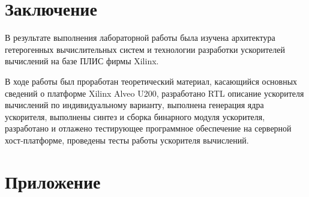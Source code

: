 \chapter*{Заключение}


В результате выполнения лабораторной работы была изучена архитектура гетерогенных вычислительных систем и технологии разработки ускорителей вычислений на базе ПЛИС фирмы Xilinx. 

В ходе работы был проработан теоретический материал, касающийся основных сведений о платформе Xilinx Alveo U200, разработано RTL описание ускорителя вычислений по индивидуальному варианту, выполнена генерация ядра ускорителя, выполнены синтез и сборка бинарного модуля ускорителя, разработано и отлажено тестирующее программное обеспечение на серверной хост-платформе, проведены тесты работы ускорителя вычислений.

\clearpage
\chapter*{Приложение}

